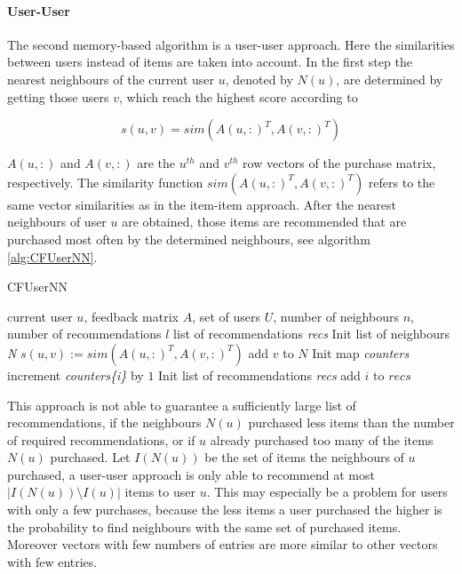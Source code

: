 \documentclass[10pt]{reportMaster}
\begin{document}
\paragraph{User-User}
The second memory-based algorithm is a user-user approach. %
Here the similarities between users instead of items are taken into account.
In the first step the nearest neighbours of the current user $u$, denoted by $N(u)$, are determined by getting those users $v$, which reach the highest score according to

\begin{equation}
	s(u,v) = sim(A(u,:)^T, A(v, :)^T)
\end{equation}

$A(u,:)$ and $A(v,:)$ are the $u^{th}$ and $v^{th}$ row vectors of the purchase matrix, respectively.
The similarity function $sim(A(u,:)^T, A(v, :)^T)$ refers to the same vector similarities as in the item-item approach.
After the nearest neighbours of user $u$ are obtained, those items are recommended that are purchased most often by the determined neighbours, see algorithm \ref{alg:CFUserNN}.

\begin{algorithm}
	\caption{CFUserNN}
	\label{alg:CFUserNN}
	\begin{algorithmic}[1]
		\Require current user $u$, feedback matrix $A$, set of users $U$, number of neighbours $n$, number of recommendations $l$
		\Ensure list of recommendations \textit{recs}
		\State Init list of neighbours \textit{N}
			\State $s(u,v) := sim(A(u,:)^T, A(v,:)^T)$
				\State add $v$ to $N$
			\EndIf
		\EndFor
		\State Init map \textit{counters}
				\State increment \textit{counters\{i\}} by $1$
			\EndFor
		\EndFor
		\State Init list of recommendations \textit{recs}
			\State add $i$ to $recs$
			\EndIf
		\EndFor
	\end{algorithmic}	
\end{algorithm}

This approach is not able to guarantee a sufficiently large list of recommendations, if the neighbours $N(u)$ purchased less items than the number of required recommendations, or if $u$ already purchased too many of the items $N(u)$ purchased.
Let $I(N(u))$ be the set of items the neighbours of $u$ purchased, a user-user approach is only able to recommend at most $|I(N(u)) \setminus I(u)|$ items to user $u$.
This may especially be a problem for users with only a few purchases, because the less items a user purchased the higher is the probability to find neighbours with the same set of purchased items.
Moreover vectors with few numbers of entries are more similar to other vectors with few entries.
\end{document}
